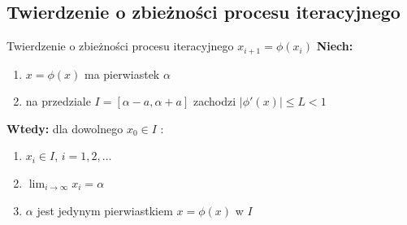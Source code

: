 \subsection{Twierdzenie o zbieżności procesu iteracyjnego}
\begin{frame}{Twierdzenie o zbieżności procesu iteracyjnego $x_{i+1} = \phi(x_{i})$}
	\textbf{Niech:}
	\begin{enumerate}
		\item $x = \phi(x)$ ma pierwiastek $\alpha$
		\item na przedziale $I = \left[\alpha - a, \alpha + a\right]$ zachodzi $\lvert \phi'(x) \rvert \leq L < 1$
	\end{enumerate}
	\vspace{1cm}
	\textbf{Wtedy: } dla dowolnego $x_{0} \in I$ :
	\begin{enumerate}
		\item $x_{i} \in I$, $i = 1, 2, \ldots$
		\item $\lim_{i \rightarrow \infty} x_{i} = \alpha$
		\item $\alpha$ jest jedynym pierwiastkiem $x = \phi(x)$ w $I$
	\end{enumerate}
\end{frame}

